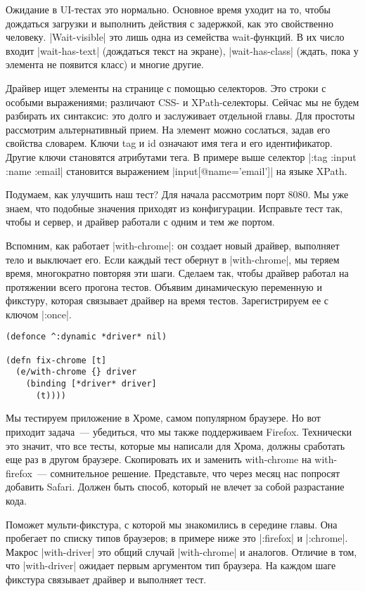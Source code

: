 Ожидание в UI-тестах это нормально. Основное время уходит на то, чтобы дождаться
загрузки и выполнить действия с задержкой, как это свойственно
человеку. \spverb|Wait-visible| это лишь одна из семейства wait-функций. В их число
входит \spverb|wait-has-text| (дождаться текст на экране), \spverb|wait-has-class| (ждать,
пока у элемента не появится класс) и многие другие.

Драйвер ищет элементы на странице с помощью селекторов. Это строки с особыми
выражениями; различают CSS- и XPath-селекторы. Сейчас мы не будем разбирать их
синтаксис: это долго и заслуживает отдельной главы. Для простоты рассмотрим
альтернативный прием. На элемент можно сослаться, задав его свойства
словарем. Ключи tag и id означают имя тега и его идентификатор. Другие ключи
становятся атрибутами тега. В примере выше селектор \spverb|{:tag :input :name :email}|
становится выражением \spverb|input[@name='email']| на языке XPath.

Подумаем, как улучшить наш тест? Для начала рассмотрим порт 8080. Мы уже знаем,
что подобные значения приходят из конфигурации. Исправьте тест так, чтобы и
сервер, и драйвер работали с одним и тем же портом.

Вспомним, как работает \spverb|with-chrome|: он создает новый драйвер, выполняет тело и
выключает его. Если каждый тест обернут в \spverb|with-chrome|, мы теряем время,
многократно повторяя эти шаги. Сделаем так, чтобы драйвер работал на протяжении
всего прогона тестов. Объявим динамическую переменную и фикстуру, которая
связывает драйвер на время тестов. Зарегистрируем ее с ключом \spverb|:once|.

\begin{verbatim}
(defonce ^:dynamic *driver* nil)

(defn fix-chrome [t]
  (e/with-chrome {} driver
    (binding [*driver* driver]
      (t))))
\end{verbatim}

Мы тестируем приложение в Хроме, самом популярном браузере. Но вот приходит
задача~--- убедиться, что мы также поддерживаем Firefox. Технически это значит,
что все тесты, которые мы написали для Хрома, должны сработать еще раз в другом
браузере. Скопировать их и заменить with-chrome на with-firefox~--- сомнительное
решение. Представьте, что через месяц нас попросят добавить Safari. Должен быть
способ, который не влечет за собой разрастание кода.

Поможет мульти-фикстура, с которой мы знакомились в середине главы. Она
пробегает по списку типов браузеров; в примере ниже это \spverb|:firefox| и
\spverb|:chrome|. Макрос \spverb|with-driver| это общий случай \spverb|with-chrome| и
аналогов. Отличие в том, что \spverb|with-driver| ожидает первым аргументом тип
браузера. На каждом шаге фикстура связывает драйвер и выполняет тест.

